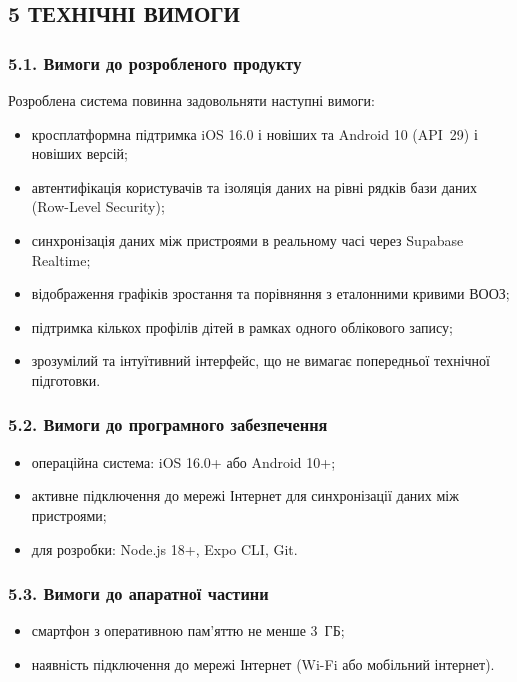 \begin{unnumbered}
\subsection{5 ТЕХНІЧНІ ВИМОГИ}

\subsubsection{5.1. Вимоги до розробленого продукту}

Розроблена система повинна задовольняти наступні вимоги:

\begin{itemize}
  \item кросплатформна підтримка iOS 16.0 і новіших та Android 10 (API~29) і новіших версій;
  \item автентифікація користувачів та ізоляція даних на рівні рядків бази даних (Row-Level Security);
  \item синхронізація даних між пристроями в реальному часі через Supabase Realtime;
  \item відображення графіків зростання та порівняння з еталонними кривими ВООЗ;
  \item підтримка кількох профілів дітей в рамках одного облікового запису;
  \item зрозумілий та інтуїтивний інтерфейс, що не вимагає попередньої технічної підготовки.
\end{itemize}

\subsubsection{5.2. Вимоги до програмного забезпечення}

\begin{itemize}
  \item операційна система: iOS 16.0+ або Android 10+;
  \item активне підключення до мережі Інтернет для синхронізації даних між пристроями;
  \item для розробки: Node.js 18+, Expo CLI, Git.
\end{itemize}

\subsubsection{5.3. Вимоги до апаратної частини}

\begin{itemize}
  \item смартфон з оперативною пам'яттю не менше 3~ГБ;
  \item наявність підключення до мережі Інтернет (Wi-Fi або мобільний інтернет).
\end{itemize}


\end{unnumbered}
